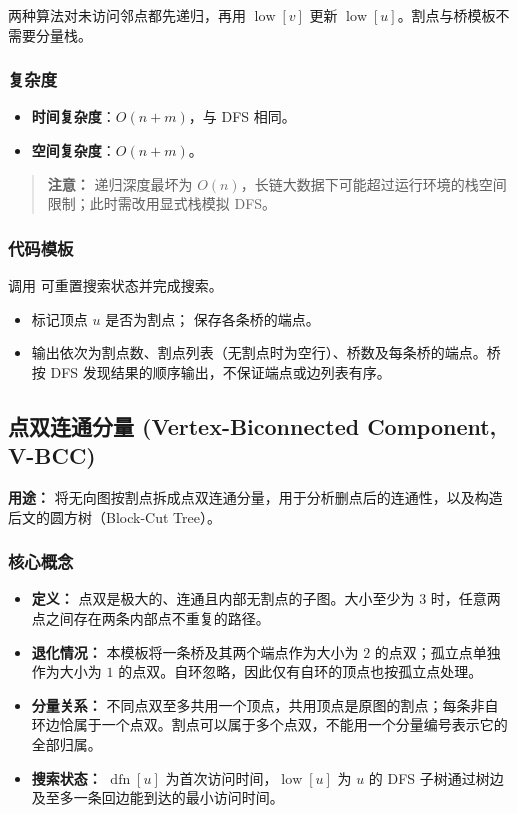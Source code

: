 \par\medskip
两种算法对未访问邻点都先递归，再用 $\operatorname{low}[v]$ 更新 $\operatorname{low}[u]$。割点与桥模板不需要分量栈。

\subsubsection{复杂度}

\begin{itemize}
  \item \textbf{时间复杂度}：$O(n + m)$，与 DFS 相同。
  \item \textbf{空间复杂度}：$O(n + m)$。
\end{itemize}

\begin{quote}
\textbf{注意：} 递归深度最坏为 $O(n)$，长链大数据下可能超过运行环境的栈空间限制；此时需改用显式栈模拟 DFS。
\end{quote}

\subsubsection{代码模板}

调用  可重置搜索状态并完成搜索。
\begin{itemize}
  \item {} 标记顶点 $u$ 是否为割点； 保存各条桥的端点。
  \item 输出依次为割点数、割点列表（无割点时为空行）、桥数及每条桥的端点。桥按 DFS 发现结果的顺序输出，不保证端点或边列表有序。
\end{itemize}



\subsection{点双连通分量 (Vertex-Biconnected Component, V-BCC)}

\textbf{用途：} 将无向图按割点拆成点双连通分量，用于分析删点后的连通性，以及构造后文的圆方树（Block-Cut Tree）。

\subsubsection{核心概念}

\begin{itemize}
  \item \textbf{定义：} 点双是极大的、连通且内部无割点的子图。大小至少为 $3$ 时，任意两点之间存在两条内部点不重复的路径。
  \item \textbf{退化情况：} 本模板将一条桥及其两个端点作为大小为 $2$ 的点双；孤立点单独作为大小为 $1$ 的点双。自环忽略，因此仅有自环的顶点也按孤立点处理。
  \item \textbf{分量关系：} 不同点双至多共用一个顶点，共用顶点是原图的割点；每条非自环边恰属于一个点双。割点可以属于多个点双，不能用一个分量编号表示它的全部归属。
  \item \textbf{搜索状态：} $\operatorname{dfn}[u]$ 为首次访问时间，$\operatorname{low}[u]$ 为 $u$ 的 DFS 子树通过树边及至多一条回边能到达的最小访问时间。
\end{itemize}

